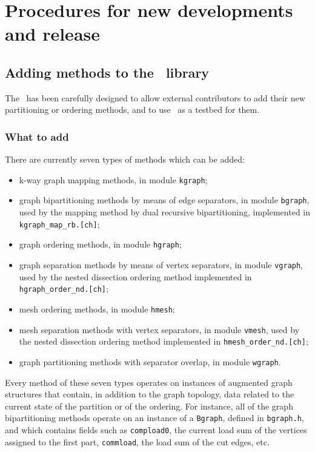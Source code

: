 
\section{Procedures for new developments and release}

\subsection{Adding methods to the \libscotch\ library}
\label{sec-method}

The \libscotch\ has been carefully designed to allow external
contributors to add their new partitioning or ordering methods, and
to use \scotch\ as a testbed for them.

\subsubsection{What to add}

There are currently seven types of methods which can be added:
\begin{itemize}
\item
k-way graph mapping methods, in module \texttt{kgraph};
\item
graph bipartitioning methods by means of edge separators, in module
\texttt{bgraph}, used by the mapping method by dual recursive
bipartitioning, implemented in \texttt{kgraph\_\lbt map\_\lbt rb.[ch]};
\item
graph ordering methods, in module \texttt{hgraph};
\item
graph separation methods by means of vertex separators, in module
\texttt{vgraph}, used by the nested dissection ordering method
implemented in \texttt{hgraph\_\lbt order\_\lbt nd.[ch]};
\item
mesh ordering methods, in module \texttt{hmesh};
\item
mesh separation methods with vertex separators, in module
\texttt{vmesh}, used by the nested dissection ordering method
implemented in \texttt{hmesh\_\lbt order\_\lbt nd.[ch]};
\item
graph partitioning methods with separator overlap, in module
\texttt{wgraph}.
\end{itemize}
Every method of these seven types operates on instances of augmented
graph structures that contain, in addition to the graph topology,
data related to the current state of the partition or of the
ordering. For instance, all of the graph bipartitioning methods
operate on an instance of a \texttt{Bgraph}, defined in \texttt{bgraph.h},
and which contains fields such as \texttt{compload0}, the current load
sum of the vertices assigned to the first part, \texttt{commload}, the
load sum of the cut edges, etc.

